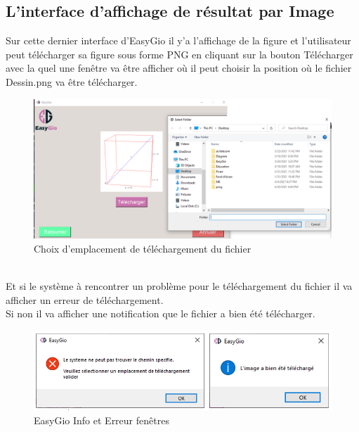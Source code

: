 \documentclass[a4paper]{report}
\begin{document}
\subsection{L'interface d'affichage de résultat par Image}
Sur cette dernier interface d'EasyGio il y'a l'affichage de la figure et l'utilisateur peut télécharger sa figure sous forme PNG en cliquant sur la bouton Télécharger avec la quel une fenêtre va être afficher où il peut choisir la position où le fichier Dessin.png va être télécharger.\\
\begin{figure}[!h]
    \centering
    \includegraphics[width=14cm]{images/CubeP.PNG}
    \caption{Choix d'emplacement de téléchargement du fichier}
    \label{fig:Choix d'emplacement de téléchargement du fichier}
\end{figure}\\
Et si le système à rencontrer un problème pour le téléchargement du fichier il va afficher un erreur de téléchargement.\\
Si non il va afficher une notification que le fichier a bien été télécharger.\\
\begin{figure}[!h]
    \centering
    \includegraphics[width=14cm]{images/nots.PNG}
    \caption{EasyGio Info et Erreur fenêtres}
    \label{fig:EasyGio Info et Erreur fenêtres}
\end{figure}\\
\end{document}
